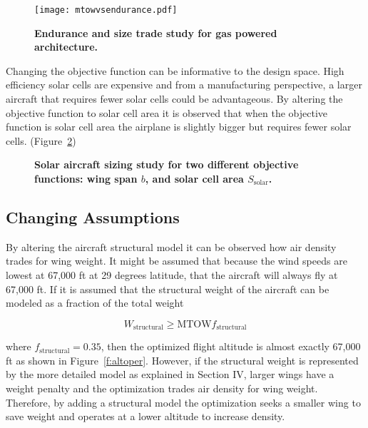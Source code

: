 \begin{figure}[H]
	\begin{center}
	\texttt{[image: mtowvsendurance.pdf]}
    \caption{\textbf{Endurance and size trade study for gas powered architecture.}}
	\label{f:spanvsendurance}
	\end{center}
\end{figure}

Changing the objective function can be informative to the design space. 
High efficiency solar cells are expensive and from a manufacturing perspective, a larger aircraft that requires fewer solar cells could be advantageous.
By altering the objective function to solar cell area it is observed that when the objective function is solar cell area the airplane is slightly bigger but requires fewer solar cells. (Figure~\ref{f:solarobjcomp})

\begin{figure}[H]
 \begin{subfigmatrix}{2}%
 \end{subfigmatrix}
    \caption{\textbf{Solar aircraft sizing study for two different objective functions: wing span $b$, and solar cell area $S_{\text{solar}}$.}}
    \label{f:solarobjcomp}
\end{figure}

\subsection{Changing Assumptions}

By altering the aircraft structural model it can be observed how air density trades for wing weight. 
It might be assumed that because the wind speeds are lowest at 67,000 ft at 29 degrees latitude, that the aircraft will always fly at 67,000 ft.  
If it is assumed that the structural weight of the aircraft can be modeled as a fraction of the total weight 

\begin{equation}
    W_{\text{structural}} \geq \text{MTOW} f_{\text{structural}}
\end{equation}

where $f_{\text{structural}} = 0.35$, then the optimized flight altitude is almost exactly 67,000 ft as shown in Figure~\ref{f:altoper}.  
However, if the structural weight is represented by the more detailed model as explained in Section IV, larger wings have a weight penalty and the optimization trades air density for wing weight.
Therefore, by adding a structural model the optimization seeks a smaller wing to save weight and operates at a lower altitude to increase density. 

